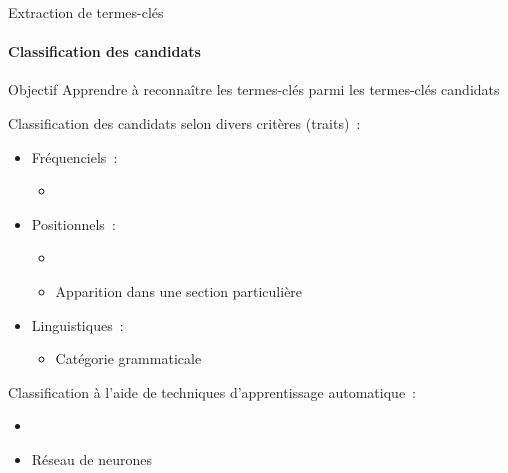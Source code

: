   \begin{frame}{Extraction de termes-clés}\framesubtitle{Classification des candidats}
    \begin{block}{Objectif}
      Apprendre à reconnaître les termes-clés parmi les termes-clés candidats
    \end{block}

    \vspace{1em}

    Classification des candidats selon divers critères (traits)~:
    \begin{itemize}
      \item{Fréquenciels~:}
      \begin{itemize}
        \item{}
      \end{itemize}
      \item{Positionnels~:}
      \begin{itemize}
        \item{}
        \item{Apparition dans une section
              particulière~\cite{nguyen2007keadocumentstructure}}
      \end{itemize}
      \item{Linguistiques~:}
      \begin{itemize}
        \item{Catégorie grammaticale~\cite{nguyen2007keadocumentstructure}}
      \end{itemize}
    \end{itemize}

    \vspace{1em}

    Classification à l'aide de techniques d'apprentissage automatique~:
    \begin{itemize}
      \item{}
      \item{Réseau de neurones~\cite{sarkar2010neuralnetwork}}
    \end{itemize}
  \end{frame}

